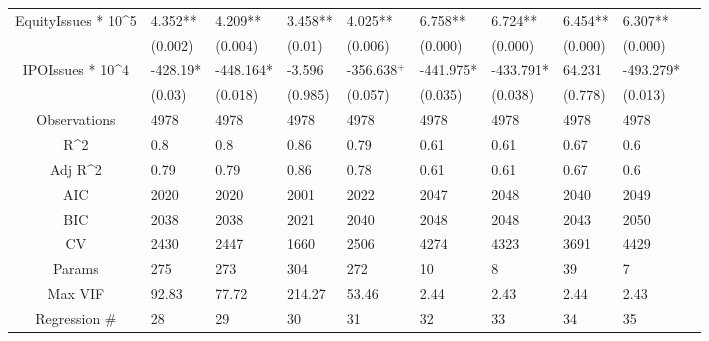 \documentclass{article}
\begin{document}
\begin{table}[H]
\begin{tabular}{|clllllllll|}
  EquityIssues * 10^5 & 4.352** & 4.209** & 3.458** & 4.025** & 6.758** & 6.724** & 6.454** & 6.307** & \\ 
   & (0.002) & (0.004) & (0.01) & (0.006) & (0.000) & (0.000) & (0.000) & (0.000) & \\ 
  IPOIssues * 10^4 & -428.19* & -448.164* & -3.596 & -356.638$^{+}$ & -441.975* & -433.791* & 64.231 & -493.279* & \\ 
   & (0.03) & (0.018) & (0.985) & (0.057) & (0.035) & (0.038) & (0.778) & (0.013) & \\ 
  \hline 
 Observations & 4978 & 4978 & 4978 & 4978 & 4978 & 4978 & 4978 & 4978 & \\ 
  R^2 & 0.8 & 0.8 & 0.86 & 0.79 & 0.61 & 0.61 & 0.67 & 0.6 & \\ 
  Adj R^2 & 0.79 & 0.79 & 0.86 & 0.78 & 0.61 & 0.61 & 0.67 & 0.6 & \\ 
  AIC & 2020 & 2020 & 2001 & 2022 & 2047 & 2048 & 2040 & 2049 & \\ 
  BIC & 2038 & 2038 & 2021 & 2040 & 2048 & 2048 & 2043 & 2050 & \\ 
  CV & 2430 & 2447 & 1660 & 2506 & 4274 & 4323 & 3691 & 4429 & \\ 
  Params & 275 & 273 & 304 & 272 & 10 & 8 & 39 & 7 & \\ 
  Max VIF & 92.83 & 77.72 & 214.27 & 53.46 & 2.44 & 2.43 & 2.44 & 2.43 & \\ 
  Regression \# & 28 & 29 & 30 & 31 & 32 & 33 & 34 & 35 & \\ 
   \hline
\end{tabular}
 
\end{table}
\end{document}
